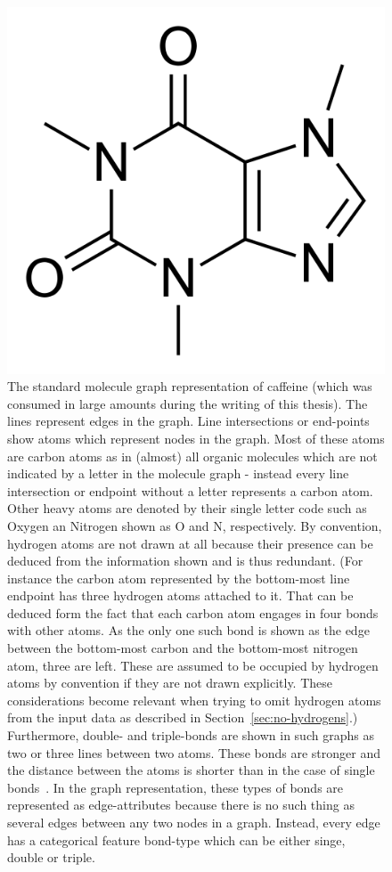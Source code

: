 \begin{figure}[H]
	\centering
	\includegraphics[width=0.6\linewidth]{figures/caffeine}
	\caption{The standard molecule graph representation of caffeine (which was consumed in large amounts during the writing of this thesis). The lines represent edges in the graph. Line intersections or end-points show atoms which represent nodes in the graph. Most of these atoms are carbon atoms as in (almost) all organic molecules which are not indicated by a letter in the molecule graph - instead every line intersection or endpoint without a letter represents a carbon atom. Other heavy atoms are denoted by their single letter code such as Oxygen an Nitrogen shown as O and N, respectively.
	By convention, hydrogen atoms are not drawn at all because their presence can be deduced from the information shown and is thus redundant. (For instance the carbon atom represented by the bottom-most line endpoint has three hydrogen atoms attached to it. That can be deduced form the fact that each carbon atom engages in four bonds with other atoms. As the only one such bond is shown as the edge between the bottom-most carbon and the bottom-most nitrogen atom, three are left. These are assumed to be occupied by hydrogen atoms by convention if they are not drawn explicitly. These considerations become relevant when trying to omit hydrogen atoms from the input data as described in Section~\ref{sec:no-hydrogens}.)
	Furthermore, double- and triple-bonds are shown in such graphs as two or three lines between two atoms. These bonds are stronger and the distance between the atoms is shorter than in the case of single bonds~\cite{Organic-chemistry}. In the graph representation, these types of bonds are represented as edge-attributes because there is no such thing as several edges between any two nodes in a graph. Instead, every edge has a categorical feature bond-type which can be either singe, double or triple.
	}
	\label{fig:caffeine}
\end{figure}


